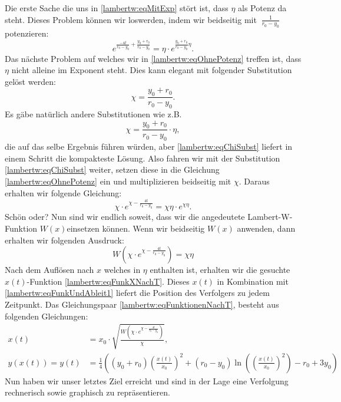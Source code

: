 Die erste Sache die uns in \eqref{lambertw:eqMitExp} stört ist, dass \(\eta\) als Potenz da steht. Dieses Problem können wir loswerden, indem wir beidseitig mit \(\:\displaystyle \frac{1}{r_0-y_0}\:\) potenzieren:
\begin{equation}
	e^{\displaystyle \frac{-4t}{r_0-y_0}+\frac{y_0+r_0}{r_0-y_0}}
	=
	\eta\cdot e^{\displaystyle \frac{y_0+r_0}{r_0-y_0}\eta} .
	\label{lambertw:eqOhnePotenz}
\end{equation}
Das nächste Problem auf welches wir in \eqref{lambertw:eqOhnePotenz} treffen ist, dass \(\eta\) nicht alleine im Exponent steht. Dies kann elegant mit folgender Substitution gelöst werden:
\begin{equation}
	\chi
	=
	\frac{y_0+r_0}{r_0-y_0}.
	\label{lambertw:eqChiSubst}
\end{equation}
Es gäbe natürlich andere Substitutionen wie z.B. 
\[\displaystyle \chi=\frac{y_0+r_0}{r_0-y_0}\cdot\eta,\] 
die auf das selbe Ergebnis führen würden, aber \eqref{lambertw:eqChiSubst} liefert in einem Schritt die kompakteste Lösung. Also fahren wir mit der  Substitution \eqref{lambertw:eqChiSubst} weiter, setzen diese in die Gleichung \eqref{lambertw:eqOhnePotenz} ein und multiplizieren beidseitig mit \(\chi\). Daraus erhalten wir folgende Gleichung:
\begin{equation}
	\chi\cdot e^{\displaystyle \chi-\frac{4t}{r_0-y_0}}
	=
	\chi\eta\cdot e^{\displaystyle \chi\eta}.
	\label{lambertw:eqNachSubst}
\end{equation}
Schön oder? Nun sind wir endlich soweit, dass wir die angedeutete Lambert-W-Funktion \(W(x)\)einsetzen können. Wenn wir beidseitig \(W(x)\) anwenden, dann erhalten wir folgenden Ausdruck:
\begin{equation}
	W\left(\chi\cdot e^{\displaystyle \chi-\frac{4t}{r_0-y_0}}\right)
	=
	\chi\eta
\end{equation}
Nach dem Auflösen nach \(x\) welches in \(\eta\) enthalten ist, erhalten wir die gesuchte \(x(t)\)-Funktion \eqref{lambertw:eqFunkXNachT}. Dieses \(x(t)\) in Kombination mit \eqref{lambertw:eqFunkUndAbleit1} liefert die Position des Verfolgers zu jedem Zeitpunkt. Das Gleichungspaar \eqref{lambertw:eqFunktionenNachT}, besteht aus folgenden Gleichungen:
\begin{subequations}
	\begin{align}
		\label{lambertw:eqFunkXNachT}
		x(t)
		&=
		x_0\cdot\sqrt{\frac{W\left(\chi\cdot e^{\displaystyle \chi-\frac{4t}{r_0-y_0}}\right)}{\chi}}, \\
		\label{lambertw:eqFunkYNachT}
		y(x(t))
		=
		y(t)
		&=
		\frac{1}{4}\left(\left(y_0+r_0\right)\left(\frac{x(t)}{x_0}\right)^2+\left(r_0-y_0\right)\operatorname{ln}\left(\left(\frac{x(t)}{x_0}\right)^2\right)-r_0+3y_0\right)
	\end{align}
	\label{lambertw:eqFunktionenNachT}
\end{subequations}
Nun haben wir unser letztes Ziel erreicht und sind in der Lage eine Verfolgung rechnerisch sowie graphisch zu repräsentieren.
 
